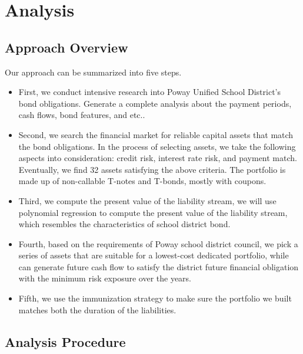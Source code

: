\documentclass[oneside,12pt]{report}
\begin{document}
{\chapter{Analysis}\label{}

\section{Approach Overview}
 Our approach can be summarized into five steps. \\
\begin{itemize}
\item First, we conduct intensive research into Poway Unified School District's bond obligations. Generate a complete analysis about the payment periods, cash flows, bond features, and etc..\\

\item Second, we search the financial market for reliable capital assets that match the bond obligations. In the process of selecting assets, we take the following aspects into consideration: credit risk, interest rate risk, and payment match. Eventually, we find 32 assets satisfying the above criteria. The portfolio is made up of non-callable T-notes and T-bonds, mostly with coupons.\\

\item Third, we compute the present value of the liability stream, we will use polynomial regression to compute the present value of the liability stream, which resembles the characteristics of school district bond. \\

\item Fourth, based on the requirements of Poway school district council, we pick a series of assets that are suitable for a lowest-cost dedicated portfolio, while can generate future cash flow to satisfy the district future financial obligation with the minimum risk exposure over the years.\\

\item Fifth, we use the immunization strategy to make sure the portfolio we built matches both the duration of the liabilities.\\

\end{itemize}
\newpage
\section{Analysis Procedure}

}
\end{document}
